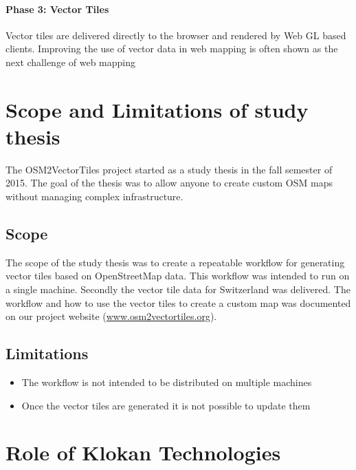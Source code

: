 \paragraph{Phase 3: Vector Tiles}

Vector tiles are delivered directly to the browser and rendered by Web
GL based clients.
\newline{}
Improving the use of vector data in web mapping is often shown as the next challenge
of web mapping \cite[p.~88]{gaffuri2012toward}

\section{Scope and Limitations of study thesis}\label{part1_scope_of_study_thesis}

The OSM2VectorTiles project started as a study thesis in the fall semester of 2015. The goal of the thesis was to allow anyone to create custom OSM maps without managing complex infrastructure.

\subsection{Scope}\label{part1_scope}

The scope of the study thesis was to create a repeatable workflow for generating vector tiles based on OpenStreetMap data. This workflow was intended to run on a single machine. Secondly the vector tile data for Switzerland was delivered. The workflow and how to use the vector tiles to create a custom map was documented on our project website (\url{www.osm2vectortiles.org}).

\subsection{Limitations}\label{part1_limitations}

\begin{itemize}
    \item The workflow is not intended to be distributed on multiple machines \item Once the vector tiles are generated it is not possible to update them
\end{itemize}

\section{Role of Klokan Technologies}\label{part1_role_of_klokan_technologies}

